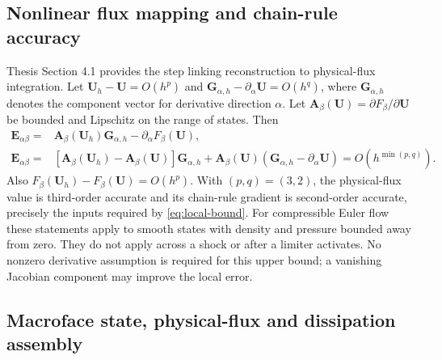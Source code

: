 \documentclass[11pt]{article}
\newcommand{\U}{\bm{U}}
\begin{document}
\subsection{Nonlinear flux mapping and chain-rule accuracy}\label{sec:chain-rule}

Thesis Section 4.1 \cite{ma2026thesis} provides the step linking reconstruction to physical-flux integration.  Let $\U_h-\U=O(h^p)$ and $\bm G_{\alpha,h}-\partial_\alpha\U=O(h^q)$, where $\bm G_{\alpha,h}$ denotes the component vector for derivative direction $\alpha$.  Let $\bm A_\beta(\U)=\partial F_\beta/\partial\U$ be bounded and Lipschitz on the range of states.  Then
\begin{equation}
\begin{split}
 \bm E_{\alpha\beta}={}&\bm A_\beta(\U_h)\bm G_{\alpha,h}
       -\partial_\alpha F_\beta(\U),\\
 \bm E_{\alpha\beta}={}&[\bm A_\beta(\U_h)-\bm A_\beta(\U)]\bm G_{\alpha,h}
       +\bm A_\beta(\U)(\bm G_{\alpha,h}-\partial_\alpha\U)
       =O(h^{\min(p,q)}).
\end{split}
\label{eq:chain-error}
\end{equation}
Also $F_\beta(\U_h)-F_\beta(\U)=O(h^p)$.  With $(p,q)=(3,2)$, the physical-flux value is third-order accurate and its chain-rule gradient is second-order accurate, precisely the inputs required by \eqref{eq:local-bound}.  For compressible Euler flow these statements apply to smooth states with density and pressure bounded away from zero.  They do not apply across a shock or after a limiter activates.  No nonzero derivative assumption is required for this upper bound; a vanishing Jacobian component may improve the local error.

\subsection{Macroface state, physical-flux and dissipation assembly}\label{sec:macroface}
\end{document}
